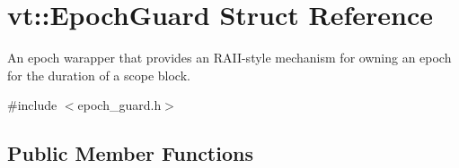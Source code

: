 \hypertarget{structvt_1_1_epoch_guard}{}\section{vt\+:\+:Epoch\+Guard Struct Reference}
\label{structvt_1_1_epoch_guard}


An epoch warapper that provides an R\+A\+I\+I-\/style mechanism for owning an epoch for the duration of a scope block.  




{\ttfamily \#include $<$epoch\+\_\+guard.\+h$>$}

\subsection*{Public Member Functions}
